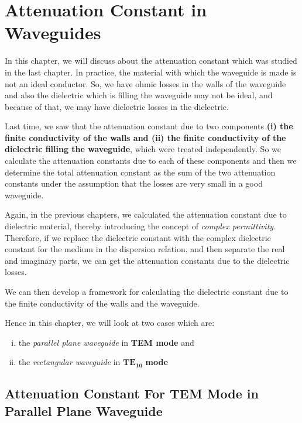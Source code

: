 \chapter{Attenuation Constant in Waveguides}
In this chapter, we will discuss about the attenuation constant which was studied in the last chapter. In practice, the material with which the waveguide is made is not an ideal conductor. So, we have ohmic losses in the walls of the waveguide and also the dielectric which is filling the waveguide may not be ideal, and because of that, we may have dielectric losses in the dielectric.

Last time, we saw that the attenuation constant due to two components \textbf{(i) the finite conductivity of the walls and (ii) the finite conductivity of the dielectric filling the waveguide}, which were treated independently. So we calculate the attenuation constants due to each of these components and then we determine the total attenuation constant as the sum of the two attenuation constants under the assumption that the losses are very small in a good waveguide.

Again, in the previous chapters, we calculated the attenuation constant due to dielectric material, thereby introducing the concept of \emph{complex permittivity}. Therefore, if we replace the dielectric constant with the complex dielectric constant for the medium in the dispersion relation, and then separate the real and imaginary parts, we can get the attenuation constants due to the dielectric losses.

We can then develop a framework for calculating the dielectric constant due to the finite conductivity of the walls and the waveguide.

Hence in this chapter, we will look at two cases which are:
\begin{enumerate}[(i)]
\item the \emph{parallel plane waveguide} in \textbf{TEM mode} and
\item the \emph{rectangular waveguide} in $\boldsymbol{TE_{10}}$ \textbf{mode}
\end{enumerate}

\section{Attenuation Constant For TEM Mode in Parallel Plane Waveguide}

